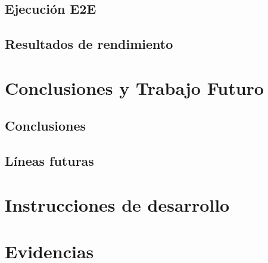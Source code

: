 \documentclass[spanish]{esi-tfg}
\begin{document}
\section{Ejecución E2E}
\section{Resultados de rendimiento}

\chapter{Conclusiones y Trabajo Futuro}
\section{Conclusiones}
\section{Líneas futuras}

\appendix



\chapter{Instrucciones de desarrollo}

\chapter{Evidencias}



\end{document}
